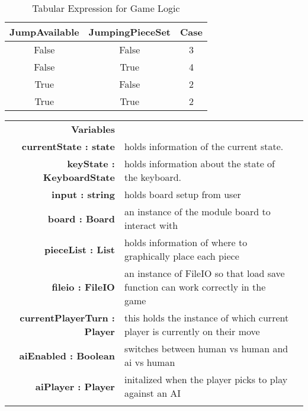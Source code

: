 \documentclass[10pt]{article}
\begin{document}
\begin{table}[ht]
\caption{Tabular Expression for Game Logic}
\centering
\begin{tabular}{c c c}
\hline \hline
JumpAvailable & JumpingPieceSet & Case \\ [0.5ex]
\hline
False & False & 3 
\\
False & True & 4 
\\
True & False & 2 
\\
True & True & 2 
\\
\hline
\end{tabular}
\label{table:nonlin}
\end{table}
        \begin{longtabu}{ >{\bfseries}r Xp{2cm} }
            Variables       & \begin{tabular}[t]{@{} l p{8cm}} 
                                     & \\
                               		currentState : state & holds information of the current state. \\
									keyState : KeyboardState & holds information about the state of the keyboard. \\
                                    input : string & holds board setup from user \\ 
                                    board : Board & an instance of the module board to interact with\\
                                    pieceList : List &  holds information of where to graphically place each piece \\
									fileio : FileIO & an instance of FileIO so that load save function can work correctly in the game\\
									currentPlayerTurn : Player & this holds the instance of which current player is currently on their move\\
									aiEnabled : Boolean & switches between human vs human and ai vs human \\
									aiPlayer : Player & initalized when the player picks to play against an AI\\
                                    
                              \end{tabular} \\


\end{longtabu}
\end{document}
